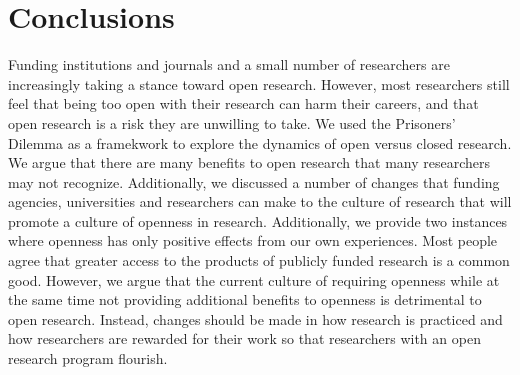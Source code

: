 \documentclass[11pt]{article} %
\begin{document}
\section{Conclusions}
Funding institutions and journals and a small number of researchers are increasingly taking a stance toward open research. However, most researchers still feel that being too open with their research can harm their careers, and that open research is a risk they are unwilling to take. We used the Prisoners' Dilemma as a framekwork to explore the dynamics of open versus closed research. We argue that there are many benefits to open research that many researchers may not recognize. Additionally, we discussed a number of changes that funding agencies, universities and researchers can make to the culture of research that will promote a culture of openness in research. Additionally, we provide two instances where openness has only positive effects from our own experiences. Most people agree that greater access to the products of publicly funded research is a common good. However, we argue that the current culture of requiring openness while at the same time not providing additional benefits to openness is detrimental to open research. Instead, changes should be made in how research is practiced and how researchers are rewarded for their work so that researchers with an open research program flourish.






\end{document}
